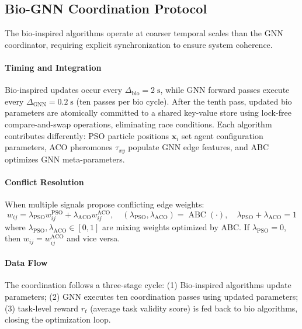 \documentclass{article}
\begin{document}
\subsection{Bio-GNN Coordination Protocol}
\label{subsec:bio_gnn_protocol}

The bio-inspired algorithms operate at coarser temporal scales than the GNN coordinator, requiring explicit synchronization to ensure system coherence.

\paragraph{Timing and Integration} Bio-inspired updates occur every $\Delta_{\text{bio}} = 2\;\text{s}$, while GNN forward passes execute every $\Delta_{\text{GNN}} = 0.2\;\text{s}$ (ten passes per bio cycle). After the tenth pass, updated bio parameters are atomically committed to a shared key-value store using lock-free compare-and-swap operations, eliminating race conditions. Each algorithm contributes differently: PSO particle positions $\mathbf{x}_i$ set agent configuration parameters, ACO pheromones $\tau_{xy}$ populate GNN edge features, and ABC optimizes GNN meta-parameters.

\paragraph{Conflict Resolution} When multiple signals propose conflicting edge weights:
\begin{equation}
\label{eq:conflict_resolution}
w_{ij} = \lambda_{\text{PSO}} w_{ij}^{\text{PSO}} + \lambda_{\text{ACO}} w_{ij}^{\text{ACO}}, \quad (\lambda_{\text{PSO}},\lambda_{\text{ACO}}) = \operatorname{ABC}(\cdot), \quad \lambda_{\text{PSO}} + \lambda_{\text{ACO}} = 1
\end{equation}
where $\lambda_{\text{PSO}}, \lambda_{\text{ACO}} \in [0,1]$ are mixing weights optimized by ABC. If $\lambda_{\text{PSO}} = 0$, then $w_{ij} = w_{ij}^{\text{ACO}}$ and vice versa.

\paragraph{Data Flow} The coordination follows a three-stage cycle: (1) Bio-inspired algorithms update parameters; (2) GNN executes ten coordination passes using updated parameters; (3) task-level reward $r_t$ (average task validity score) is fed back to bio algorithms, closing the optimization loop.
\end{document}
